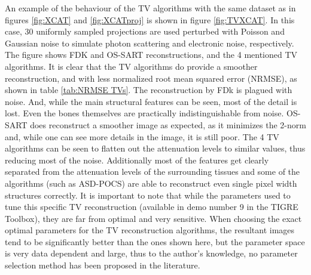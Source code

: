 An example of the behaviour of the TV algorithms with the same dataset as in figures \ref{fig:XCAT} and \ref{fig:XCATproj} is shown in figure \ref{fig:TVXCAT}. In this case, 30 uniformly sampled projections are used perturbed with Poisson and Gaussian noise to simulate photon scattering and electronic noise, respectively. The figure shows FDK and OS-SART reconstructions, and the 4 mentioned TV algorithms. It is clear that the TV algorithms do provide a smoother reconstruction, and with less normalized root mean squared error (NRMSE), as shown in table \ref{tab:NRMSE TVs}.
The reconstruction by FDk is plagued with noise. And, while the main structural features can be seen, most of the detail is lost. Even the bones themselves are practically indistinguishable from noise. OS-SART does reconstruct a smoother image as expected, as it minimizes the 2-norm and, while one can see more details in the image, it is still poor. The 4 TV algorithms can be seen to flatten out the attenuation levels to similar values, thus reducing most of the noise. Additionally most of the features get clearly separated from the attenuation levels of the surrounding tissues and some of the algorithms (such as ASD-POCS) are able to reconstruct even single pixel width structures correctly. It is important to note that while the parameters used to tune this specific TV reconstruction (available in demo number 9 in the TIGRE Toolbox), they are far from optimal and very sensitive\cite{Vee}. When choosing the exact optimal parameters for the TV reconstruction algorithms, the resultant images tend to be significantly better than the ones shown here, but the parameter space is very data dependent and large, thus to the author's knowledge, no parameter selection method has been proposed in the literature. 


